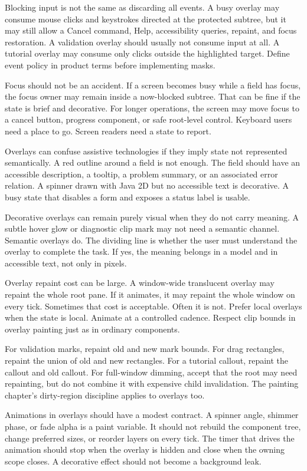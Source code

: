 Blocking input is not the same as discarding all events. A busy overlay may consume mouse clicks and keystrokes directed at the protected subtree, but it may still allow a Cancel command, Help, accessibility queries, repaint, and focus restoration. A validation overlay should usually not consume input at all. A tutorial overlay may consume only clicks outside the highlighted target. Define event policy in product terms before implementing masks.

Focus should not be an accident. If a screen becomes busy while a field has focus, the focus owner may remain inside a now-blocked subtree. That can be fine if the state is brief and decorative. For longer operations, the screen may move focus to a cancel button, progress component, or safe root-level control. Keyboard users need a place to go. Screen readers need a state to report.

Overlays can confuse assistive technologies if they imply state not represented semantically. A red outline around a field is not enough. The field should have an accessible description, a tooltip, a problem summary, or an associated error relation. A spinner drawn with Java 2D but no accessible text is decorative. A busy state that disables a form and exposes a status label is usable.

Decorative overlays can remain purely visual when they do not carry meaning. A subtle hover glow or diagnostic clip mark may not need a semantic channel. Semantic overlays do. The dividing line is whether the user must understand the overlay to complete the task. If yes, the meaning belongs in a model and in accessible text, not only in pixels.

Overlay repaint cost can be large. A window-wide translucent overlay may repaint the whole root pane. If it animates, it may repaint the whole window on every tick. Sometimes that cost is acceptable. Often it is not. Prefer local overlays when the state is local. Animate at a controlled cadence. Respect clip bounds in overlay painting just as in ordinary components.

For validation marks, repaint old and new mark bounds. For drag rectangles, repaint the union of old and new rectangles. For a tutorial callout, repaint the callout and old callout. For full-window dimming, accept that the root may need repainting, but do not combine it with expensive child invalidation. The painting chapter's dirty-region discipline applies to overlays too.

Animations in overlays should have a modest contract. A spinner angle, shimmer phase, or fade alpha is a paint variable. It should not rebuild the component tree, change preferred sizes, or reorder layers on every tick. The timer that drives the animation should stop when the overlay is hidden and close when the owning scope closes. A decorative effect should not become a background leak.

